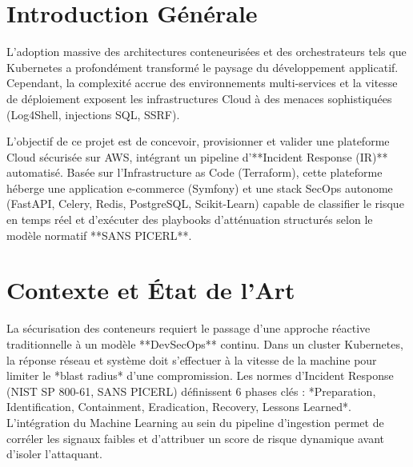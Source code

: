 \documentclass[12pt,a4paper]{report}
\begin{document}
\tableofcontents
\newpage

\chapter{Introduction Générale}
L'adoption massive des architectures conteneurisées et des orchestrateurs tels que Kubernetes a profondément transformé le paysage du développement applicatif. Cependant, la complexité accrue des environnements multi-services et la vitesse de déploiement exposent les infrastructures Cloud à des menaces sophistiquées (Log4Shell, injections SQL, SSRF). 

L'objectif de ce projet est de concevoir, provisionner et valider une plateforme Cloud sécurisée sur AWS, intégrant un pipeline d'**Incident Response (IR)** automatisé. Basée sur l'Infrastructure as Code (Terraform), cette plateforme héberge une application e-commerce (Symfony) et une stack SecOps autonome (FastAPI, Celery, Redis, PostgreSQL, Scikit-Learn) capable de classifier le risque en temps réel et d'exécuter des playbooks d'atténuation structurés selon le modèle normatif **SANS PICERL**.

\chapter{Contexte et État de l'Art}
La sécurisation des conteneurs requiert le passage d'une approche réactive traditionnelle à un modèle **DevSecOps** continu. Dans un cluster Kubernetes, la réponse réseau et système doit s'effectuer à la vitesse de la machine pour limiter le *blast radius* d'une compromission. Les normes d'Incident Response (NIST SP 800-61, SANS PICERL) définissent 6 phases clés : *Preparation, Identification, Containment, Eradication, Recovery, Lessons Learned*. L'intégration du Machine Learning au sein du pipeline d'ingestion permet de corréler les signaux faibles et d'attribuer un score de risque dynamique avant d'isoler l'attaquant.

\end{document}
